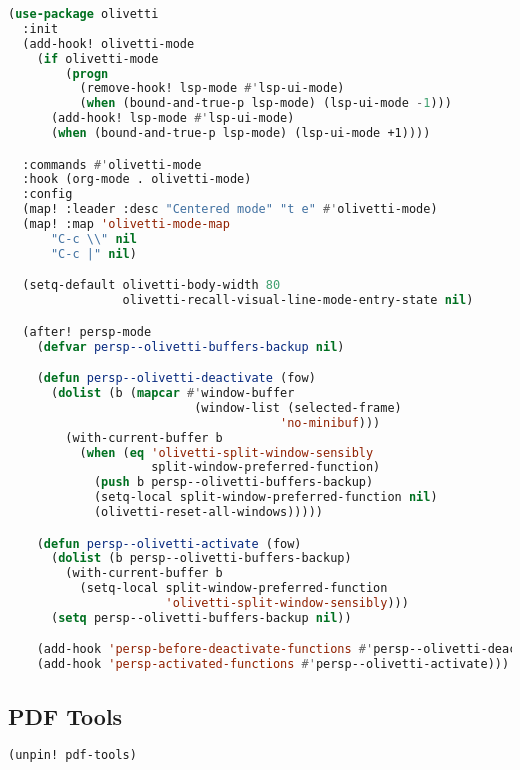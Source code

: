 \documentclass[11pt]{article}
\begin{document}
\begin{lstlisting}[language=Lisp]
(use-package olivetti
  :init
  (add-hook! olivetti-mode
    (if olivetti-mode
        (progn
          (remove-hook! lsp-mode #'lsp-ui-mode)
          (when (bound-and-true-p lsp-mode) (lsp-ui-mode -1)))
      (add-hook! lsp-mode #'lsp-ui-mode)
      (when (bound-and-true-p lsp-mode) (lsp-ui-mode +1))))

  :commands #'olivetti-mode
  :hook (org-mode . olivetti-mode)
  :config
  (map! :leader :desc "Centered mode" "t e" #'olivetti-mode)
  (map! :map 'olivetti-mode-map
      "C-c \\" nil
      "C-c |" nil)

  (setq-default olivetti-body-width 80
                olivetti-recall-visual-line-mode-entry-state nil)

  (after! persp-mode
    (defvar persp--olivetti-buffers-backup nil)

    (defun persp--olivetti-deactivate (fow)
      (dolist (b (mapcar #'window-buffer
                          (window-list (selected-frame)
                                      'no-minibuf)))
        (with-current-buffer b
          (when (eq 'olivetti-split-window-sensibly
                    split-window-preferred-function)
            (push b persp--olivetti-buffers-backup)
            (setq-local split-window-preferred-function nil)
            (olivetti-reset-all-windows)))))

    (defun persp--olivetti-activate (fow)
      (dolist (b persp--olivetti-buffers-backup)
        (with-current-buffer b
          (setq-local split-window-preferred-function
                      'olivetti-split-window-sensibly)))
      (setq persp--olivetti-buffers-backup nil))

    (add-hook 'persp-before-deactivate-functions #'persp--olivetti-deactivate)
    (add-hook 'persp-activated-functions #'persp--olivetti-activate)))
\end{lstlisting}

\subsection{PDF Tools}
\label{sec:pdf-tools}
\begin{lstlisting}[language=Lisp]
(unpin! pdf-tools)
\end{lstlisting}
\end{document}
